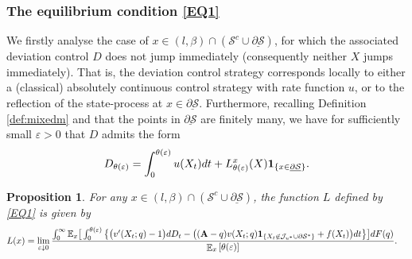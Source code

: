 \documentclass[11pt]{article} %
\newtheorem{proposition}[theorem]{Proposition}
\DeclareMathOperator{\E}{\mathbb E}
\numberwithin{komcounter}{section}
\renewcommand{\ul}{\underline}
\renewcommand{\epsilon}{\varepsilon}
\begin{document}
\subsubsection{The equilibrium condition \eqref{EQ1}}
\label{sec:EQ1}
We firstly analyse the case of $x\in (l,\beta) \cap (\mathcal{S}^c \cup \ul{\partial \mathcal{S}})$, for which the associated deviation control $D$ does not jump immediately (consequently neither $X$ jumps immediately). 
That is, the deviation control strategy corresponds locally to either a (classical) absolutely continuous control strategy with rate function $u$, or to the reflection of the state-process at $x\in\ul{\partial \mathcal{S}}$. Furthermore, recalling Definition \ref{def:mixedm} and that the points in $\ul{\partial \mathcal{S}}$ are finitely many, we have for sufficiently small $\epsilon>0$ that $D$ admits the form
\begin{align} \label{D_form_proof}
D_{\theta(\epsilon)}=\int_0^{\theta(\epsilon)}u(X_t)dt+L^x_{\theta(\epsilon)}(X) {\bf 1}_{\{x\in \ul{\partial \mathcal{S}}\}}.
\end{align}
\begin{proposition} \label{splitL}
For any $x\in (l,\beta) \cap (\mathcal{S}^c \cup \ul{\partial \mathcal{S}})$, the function $L$ defined by \eqref{EQ1} is given by 
\begin{align*} 
L(x) &= \lim_{\epsilon \downarrow 0} \frac{\int_0^\infty \mathbb{E}_x\big[ \int_0^{\theta(\epsilon)} \big\{ \big(v'(X_{t};q) - 1 \big) dD_t - \big((\textbf{A}-q) v(X_t;q) {\bf 1}_{\{X_t\not\in \mathcal{J}_{u^*} \cup \partial\mathcal{S}^*\}} + f(X_t) \big) dt \big\} \big] dF(q) }{\E_{x}\left[\theta(\epsilon)\right]}.
\end{align*}
\end{proposition} 
\end{document}
